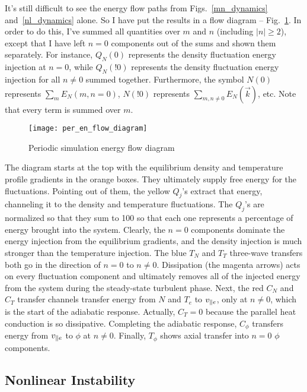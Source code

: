 It's still difficult to see the energy flow paths from Figs.~\ref{mn_dynamics} and~\ref{nl_dynamics} alone. So I have put the results in a flow diagram -- Fig.~\ref{per_en_flow_diagram}. In order to
do this, I've summed all quantities over $m$ and $n$ (including $|n| \ge 2$), 
except that I have left $n=0$ components out of the sums and shown them separately. For instance, $Q_N(0)$ represents the density fluctuation
energy injection at $n=0$, while $Q_N(!0)$ represents the density fluctuation energy injection for all $n \ne 0$ summed together. Furthermore, the symbol $N(0)$ represents 
$\sum_{m}E_N(m,n=0)$,
$N(!0)$ represents $\sum_{m,n \ne 0} E_N(\vec{k})$, etc. Note that every term is summed over $m$.

\begin{figure}
\centerline{\texttt{[image: per\_en\_flow\_diagram]}}
\caption{Periodic simulation energy flow diagram}
\label{per_en_flow_diagram}
\end{figure}

The diagram starts at the top with the equilibrium density and temperature profile gradients in the orange boxes. They ultimately supply free energy for the fluctuations. 
Pointing out of them, the yellow $Q_j$'s extract that energy, channeling it to the density and temperature fluctuations. 
The $Q_j$'s are normalized so that they sum to 100 so that each one represents a percentage of energy brought into the system. 
Clearly, the $n=0$ components dominate the energy injection from the equilibrium gradients, and the density injection is much stronger than the temperature injection. 
The blue $T_N$ and $T_T$ three-wave transfers both go in the direction of $n=0$ to $n \ne 0$. 
Dissipation (the magenta arrows) acts on every fluctuation component and ultimately removes all of the injected energy from the system during the steady-state turbulent phase. 
Next, the red $C_N$ and $C_T$ transfer channels transfer energy from $N$ and $T_e$ to $v_{\parallel e}$, only at $n \ne 0$, which is the start of the adiabatic response. 
Actually, $C_T = 0$ because the parallel heat conduction is so dissipative. Completing the adiabatic response, $C_\phi$ transfers energy from $v_{\parallel e}$ to $\phi$ at $n \ne 0$. 
Finally, $T_\phi$ shows axial transfer into $n=0$ $\phi$ components.


\subsection{Nonlinear Instability}
\label{ss_nl_inst}

